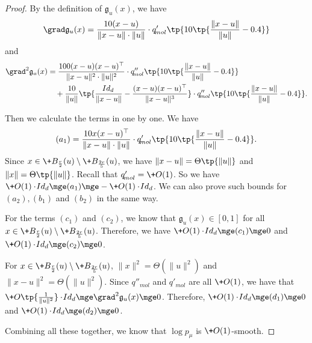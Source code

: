 \begin{proof}
    By the definition of $\mathfrak{g}_{u}(x)$, we have
     \[
        \grad \mathfrak{g}_{u}(x) = \frac{10(x-u)}{\|x-u\|\cdot \|u\|}\cdot  q'_{\!{mol}}\tp{10\tp{\frac{\|x-u\|}{\|u\|}-0.4}}
     \]
     and 
     \begin{align*}
        \grad^2 \mathfrak{g}_{u}(x) &= \frac{100(x-u)(x-u)^{\top}}{\|x-u\|^2\cdot \|u\|^2}\cdot  q''_{\!{mol}}\tp{10\tp{\frac{\|x-u\|}{\|u\|}-0.4}} \\
        &\quad + \frac{10}{\|u\|}\tp{\frac{\!{Id}_d}{\|x-u\|} - \frac{(x-u)(x-u)^{\top}}{\|x-u\|^3}} \cdot  q''_{\!{mol}}\tp{10\tp{\frac{\|x-u\|}{\|u\|}-0.4}}.
     \end{align*}

     Then we calculate the terms in  one by one. We have 
     \[ 
        (a_1) = \frac{10x(x-u)^{\top}}{\|x-u\|\cdot \|u\|}\cdot  q'_{\!{mol}}\tp{10\tp{\frac{\|x-u\|}{\|u\|}-0.4}}.
    \]
    Since $x\in 
    \+B_{\frac{r}{2}}(u)\setminus \+B_{\frac{2r}{5}}(u)$, we have $\|x-u\|=\Theta\tp{\|u\|}$ and $\|x\|=\Theta\tp{\|u\|}$. Recall that $q'_{\!{mol}}=\+O(1)$. So we have $\+O(1)\cdot \!{Id}_d\mge (a_1)\mge -\+O(1)\cdot \!{Id}_d$. We can also prove such bounds for $(a_2), (b_1)$ and $(b_2)$ in the same way.

    For the terms $(c_1)$ and $(c_2)$, we know that $\mathfrak{g}_{u}(x)\in [0,1]$ for all $x\in \+B_{\frac{r}{2}}(u)\setminus \+B_{\frac{2r}{5}}(u)$. Therefore, we have $\+O(1)\cdot \!{Id}_d\mge (c_1)\mge 0$ and $\+O(1)\cdot \!{Id}_d\mge (c_2)\mge 0$.

    For $x\in \+B_{\frac{r}{2}}(u)\setminus \+B_{\frac{2r}{5}}(u)$, $\|x\|^2=\Theta(\|u\|^2)$ and $\|x-u\|^2=\Theta(\|u\|^2)$. Since $q''_{\!{mol}}$ and $q'_{\!{mol}}$ are all $\+O(1)$, we have that $\+O\tp{\frac{1}{\|u\|^2}}\cdot \!{Id}_d\mge \grad^2 \mathfrak{g}_{u}(x) \mge 0$. Therefore, $\+O(1)\cdot \!{Id}_d\mge (d_1)\mge 0$ and $\+O(1)\cdot \!{Id}_d\mge (d_2)\mge 0$.

    Combining all these together, we know that $\log p_{\mu}$ is $\+O(1)$-smooth.
\end{proof}

